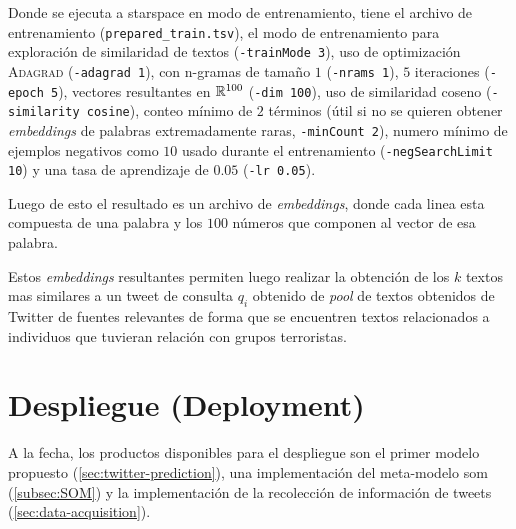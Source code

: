 Donde se ejecuta a \gls{starspace} en modo de entrenamiento, tiene el archivo de entrenamiento (\texttt{prepared\_train.tsv}), el modo de entrenamiento para exploración de similaridad de textos (\texttt{-trainMode 3}), uso de optimización \textsc{Adagrad} (\texttt{-adagrad 1}), con n-gramas de tamaño $1$ (\texttt{-nrams 1}), $5$ iteraciones (\texttt{-epoch 5}), vectores resultantes en $\mathbb{R}^{100}$ (\texttt{-dim 100}), uso de similaridad coseno (\texttt{-similarity cosine}), conteo mínimo de $2$ términos (útil si no se quieren obtener \emph{embeddings} de palabras extremadamente raras, \texttt{-minCount 2}), numero mínimo de ejemplos negativos como $10$ usado durante el entrenamiento (\texttt{-negSearchLimit 10}) y una tasa de aprendizaje de $0.05$ (\texttt{-lr 0.05}).

Luego de esto el resultado es un archivo de \emph{embeddings}, donde cada linea esta compuesta de una palabra y los $100$ números que componen al vector de esa palabra.

Estos \emph{embeddings} resultantes permiten luego realizar la obtención de los $k$ textos mas similares a un tweet de consulta $q_i$ obtenido de \emph{pool} de textos obtenidos de Twitter de fuentes relevantes de forma que se encuentren textos relacionados a individuos que tuvieran relación con grupos terroristas.


\section{Despliegue (Deployment)}
A la fecha, los productos disponibles para el despliegue son el primer modelo propuesto (\cref{sec:twitter-prediction}), una implementación del meta-modelo \gls{som} (\cref{subsec:SOM}) y la implementación de la recolección de información de tweets (\cref{sec:data-acquisition}).


